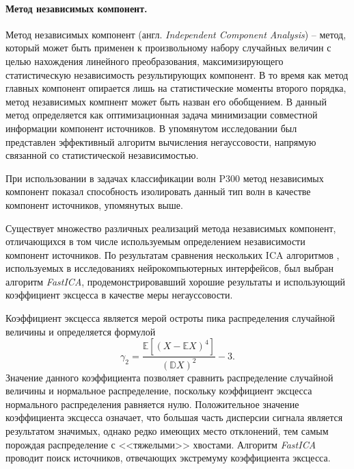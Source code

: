 \documentclass[12pt,a4paper,oneside,fleqn,leqno]{article}
\newcounter{pe} %
\begin{document}
	\paragraph{Метод независимых компонент.}
	\par Метод независимых компонент (англ. {\it Independent Component Analysis}) -- метод, который может быть применен к произвольному набору случайных величин с целью нахождения линейного преобразования, максимизирующего статистическую независимость результирующих компонент. В то время как метод главных компонент опирается лишь на статистические моменты второго порядка, метод независимых компнент может быть назван его обобщением. В \cite{Cachenoura} данный метод определяется как оптимизационная задача минимизации совместной информации компонент источников. В упомянутом исследовании был представлен эффективный алгоритм вычисления негауссовости, напрямую связанной со статистической независимостью.
	\par При использовании в задачах классификации волн P300 метод независимых компонент показал способность изолировать данный тип волн в качестве компонент источников, упомянутых выше.
	\par Существует множество различных реализаций метода независимых компонент, отличающихся в том числе используемым определением независимости компонент источников. По результатам сравнения нескольких ICA алгоритмов \cite{Cachenoura}, используемых  в исследованиях нейрокомпьютерных интерфейсов, был выбран алгоритм {\it FastICA}, продемонстрировавший хорошие результаты и использующий коэффициент эксцесса в качестве меры негауссовости.
	\par Коэффициент эксцесса является мерой остроты пика распределения случайной величины и  определяется формулой 
	$$\gamma_2 = \frac{\mathbb{E} [(X - \mathbb{E} X)^4]}{(\mathbb{D} X)^2} - 3.$$
	Значение данного коэффициента позволяет сравнить распределение случайной величины и нормальное распределение, поскольку коэффициент эксцесса нормального распределения равняется нулю. Положительное значение коэффициента эксцесса означает, что большая часть дисперсии сигнала является результатом значимых, однако редко имеющих место отклонений, тем самым порождая распределение с <<тяжелыми>> хвостами. Алгоритм {\it FastICA} проводит поиск источников, отвечающих экстремуму коэффициента эксцесса.
	
\end{document}
